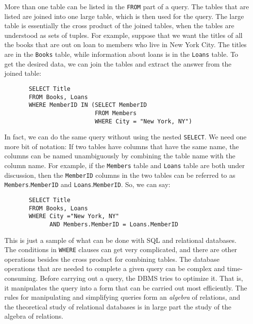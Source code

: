 More than one table can be listed in the \texttt{FROM}
part of a query.  The tables that are listed are joined
into one large table, which is then used for the query.
The large table is essentially the cross product of
the joined tables, when the tables are understood as
sets of tuples.  For example, suppose that we want the
titles of all the books that are out on loan to members who
live in New York City.  The titles are in the \texttt{Books}
table, while information about loans is in the \texttt{Loans}
table.  To get the desired data, we can join the tables
and extract the answer from the joined table:
\begin{verbatim}
       SELECT Title
       FROM Books, Loans
       WHERE MemberID IN (SELECT MemberID
                          FROM Members
                          WHERE City = "New York, NY")
\end{verbatim}
In fact, we can do the same query without using the nested
\texttt{SELECT}.  We need one more bit of notation:  If two
tables have columns that have the same name, the columns can
be named unambiguously by combining the table name with the
column name.  For example, if the \texttt{Members} table
and \texttt{Loans} table are both under discussion, then
the \texttt{MemberID} columns in the two tables can be referred
to as \texttt{Members}.\texttt{MemberID} and 
\texttt{Loans}.\texttt{MemberID}.  So, we can say:
\begin{verbatim}
       SELECT Title
       FROM Books, Loans
       WHERE City ="New York, NY"
             AND Members.MemberID = Loans.MemberID
\end{verbatim}

This is just a sample of what can be done with SQL and
relational databases.  The conditions in \texttt{WHERE}
clauses can get very complicated, and there are other
operations besides the cross product for combining tables.
The database operations that are needed to complete a
given query can be complex and time-consuming.  Before
carrying out a query, the DBMS tries to optimize it.
That is, it manipulates the query into a form that
can be carried out most efficiently.  The rules for
manipulating and simplifying queries form an \emph{algebra}
of relations, and the theoretical study of relational
databases is in large part the study of the algebra
of relations.

